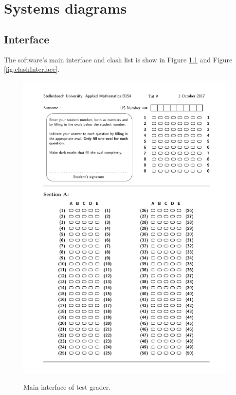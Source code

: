 \chapter{Systems diagrams}
\label{ap:Algorithms}
\graphicspath{{Appendix4/Appendix4figures/}}

\section{Interface}

The software's main interface and clash list is show in Figure \ref{fig:mainInterface} and Figure \ref{fig:clashInterface}.

\begin{figure}
  \centering
  \includegraphics[width=14cm]{mainInterface}\\
  \caption{Main interface of test grader.}
  \label{fig:mainInterface}
\end{figure}

